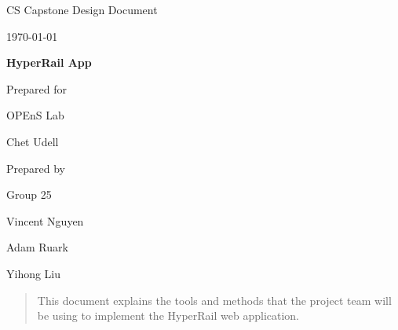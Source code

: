 \documentclass[onecolumn, draftclsnofoot,10pt, compsoc]{IEEEtran}
\def \CapstoneTeamName{		    Team 25}
\def \CapstoneTeamNumber{		25}
\def \GroupMemberOne{			Vincent Nguyen}
\def \GroupMemberTwo{			Adam Ruark}
\def \GroupMemberThree{			Yihong Liu}
\def \CapstoneProjectName{		HyperRail App}
\def \CapstoneSponsorCompany{	OPEnS Lab}
\def \CapstoneSponsorPerson{	Chet Udell}
\def \DocType{		
				Design Document
}
\newcommand{\NameSigPair}[1]{\par
\makebox[2.75in][r]{#1} \hfil 	\makebox[3.25in]{\makebox[2.25in]{\hrulefill} \hfill		\makebox[.75in]{\hrulefill}}
\par\vspace{-12pt} \textit{\tiny\noindent
\makebox[2.75in]{} \hfil		\makebox[3.25in]{\makebox[2.25in][r]{Signature} \hfill	\makebox[.75in][r]{Date}}}}
\renewcommand{\NameSigPair}[1]{#1}
\begin{document}
\begin{titlepage}
    \begin{singlespace}
        \hfill 
        \par\vspace{.2in}
        \centering
        \scshape{
            \huge CS Capstone \DocType \par
            {\large\today}\par
            \vspace{.5in}
            \textbf{\Huge\CapstoneProjectName}\par
            \vfill
            {\large Prepared for}\par
            \Huge \CapstoneSponsorCompany\par
            \vspace{5pt}
            {\Large\NameSigPair{\CapstoneSponsorPerson}\par}
            {\large Prepared by }\par
            Group\CapstoneTeamNumber\par
            \vspace{5pt}
            {\Large
                \NameSigPair{\GroupMemberOne}\par
                \NameSigPair{\GroupMemberTwo}\par
                \NameSigPair{\GroupMemberThree}\par
            }
            \vspace{20pt}
        }
        \begin{abstract}
        	This document explains the tools and methods that the project team will be using to implement the HyperRail web application.
        \end{abstract}     
    \end{singlespace}
\end{titlepage}
\newpage
{}
\tableofcontents

\clearpage

\end{document}
